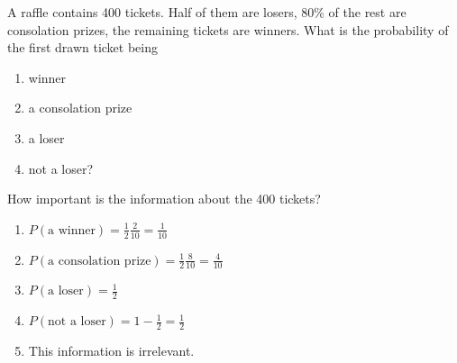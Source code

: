 \documentclass[twoside,11pt,a4paper]{article}
\newif\ifEN \ENtrue	                %
\def\tr|#1|#2|{\ifEN #2\else #1\fi}     %
\theoremstyle{definition}
\newcounter{exc}
\def\answerline#1{%
   \ifhmode\\[1ex]\fcolorbox{solbox}{solbox}{\hbox to \linewidth{\vbox to #1\baselineskip{}}}%
   \else\fcolorbox{solbox}{solbox}{\hbox to \linewidth{\vbox to #1\baselineskip{}}}%
   \fi
 }
\begin{document}
\begin{xxwrap}
\begin{exc}
\tr|Eine Tombola enthält 400 Lose. Bei der Hälfte davon gewinnt man gar nichts, bei 80\% des Restes  gewinnt man einen 
    Trostpreis und die übrigen Lose enthalten einen Preis. Was ist die Wahrscheinlichkeit, dass das erste gezogene Los 
   |A raffle contains 400 tickets. Half of them are losers, 80\% of the rest are consolation prizes, 
    the remaining tickets are winners. What is the probability of the first drawn ticket being|
\begin{enumerate}
\item \tr|einen Gewinn | winner|
\item \tr|einen Trostpreis |a consolation prize|
\item \tr|weder einen Gewinn noch einen Trostpreis |a loser|
\item \tr|einen Gewinn oder einen Trostpreis| not a loser?|
\end{enumerate}
\tr|enthält? Wie wichtig ist die Information, dass es 400 Lose sind?|How important is the information about the 400 tickets?|
\end{exc}
\begin{Answer}
  \begin{enumerate}
  \item $P(\text{\tr|ein Gewinn|a winner|})=\frac12 \frac 2{10}=\frac1{10}$
  \item $P(\text{\tr|ein Trostpreis|a consolation prize|})= \frac12\frac8{10}=\frac4{10}$
  \item $P(\text{\tr|kein Preis|a loser|})=\frac12$
  \item $P(\text{\tr|ein Preis|not a loser|})=1-\frac12=\frac12$
  \item \tr|Diese  Information ist irrelevant. |This information is irrelevant.|
  \end{enumerate}
\end{Answer}
\answerline{12}
\end{xxwrap}
\end{document}
